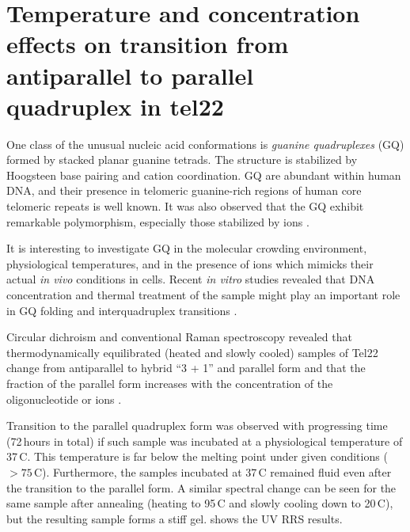 \section[%
	Temperature and concentration effects on transition from antiparallel	to
	parallel quadruplex in tel22
]{%
	Temperature and concentration effects on transition from antiparallel to
	parallel\\quadruplex in tel22
}

One class of the unusual nucleic acid conformations is
\emph{guanine quadruplexes} (GQ)
formed by stacked planar guanine tetrads.
The structure is stabilized by Hoogsteen base pairing and cation coordination.
GQ are abundant within human DNA, and their presence in telomeric guanine-rich
regions of human core telomeric repeats  is well known.
It was also observed that the GQ exhibit remarkable polymorphism, especially
those stabilized by  ions
\parencite{Chaires2013}.

It is interesting to investigate GQ in the molecular crowding environment,
physiological temperatures, and in the presence of  ions which mimicks
their actual \emph{in vivo} conditions in cells.
Recent \emph{in vitro} studies revealed that DNA concentration and thermal
treatment
of the sample might play an important role in GQ folding and interquadruplex
transitions
\parencite{Palacky2013}.

Circular dichroism and conventional Raman spectroscopy revealed that
thermodynamically equilibrated (heated and slowly cooled) samples of Tel22
change from antiparallel to hybrid “3 + 1” and parallel form and that
the fraction of the parallel form increases with the concentration of the
oligonucleotide or  ions
\parencite{Palacky2013}.

Transition to the parallel quadruplex form was observed with progressing time
(72\,hours in total) if such sample was incubated at a physiological
temperature of 37\,\textdegree{}C.
This temperature is far below the melting point under given
conditions ($> 75$\,\textdegree{}C).
Furthermore, the samples incubated at 37\,\textdegree{}C remained fluid even
after the transition to the parallel form.
A similar spectral change can be seen for the same sample after annealing
(heating to 95\,\textdegree{}C and slowly cooling down to 20\,\textdegree{}C),
but the resulting sample forms a stiff gel.
 shows the UV RRS results.

